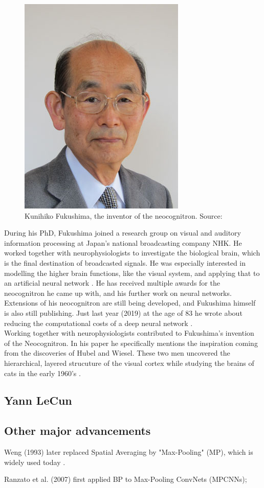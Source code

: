 \begin{figure}
    \centering
    \includegraphics{images/Fukushima.jpg}
    \caption{Kunihiko Fukushima, the inventor of the neocognitron. Source: \cite{fuzzy}}
    \label{fig:fuku}
\end{figure}

During his PhD, Fukushima joined a research group on visual and auditory information processing at Japan's national broadcasting company NHK. He worked together with neurophysiologists to investigate the biological brain, which is the final destination of broadcasted signals. He was especially interested in modelling the higher brain functions, like the visual system, and applying that to an artificial neural network \cite{fuzzy}. He has received multiple awards for the neocognitron he came up with, and his further work on neural networks.  Extensions of his neocognitron are still being developed, and Fukushima himself is also still publishing. Just last year (2019) at the age of 83 he wrote about reducing the computational costs of a deep neural network \cite{83}.\\

Working together with neurophysiologists contributed to Fukushima's invention of the Neocognitron. In his paper \cite{neocog} he specifically mentions the inspiration coming from the discoveries of Hubel and Wiesel. These two men uncovered the hierarchical, layered strucuture of the visual cortex while studying the brains of cats in the early 1960's \cite{hubel, wiesel}.


\subsection{Yann LeCun}



\subsection{Other major advancements}


Weng (1993) later replaced Spatial Averaging by "Max-Pooling" (MP), which is widely used today \cite{sch}.

Ranzato et al. (2007) first applied BP to Max-Pooling ConvNets (MPCNNs); \cite{sch}











